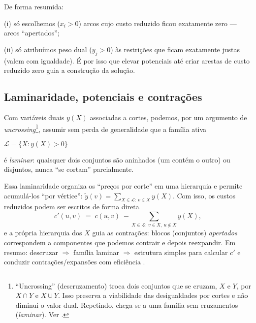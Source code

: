 De forma resumida:

(i) só escolhemos (\(x_i>0\)) arcos cujo custo reduzido ficou exatamente zero — arcos “apertados”;

(ii) só atribuímos peso dual (\(y_j>0\)) às restrições que ficam exatamente justas (valem com igualdade). É por isso que elevar potenciais até criar arestas de custo reduzido zero guia a construção da solução.

\subsection{Laminaridade, potenciais e contrações}


Com variáveis duais \(y(X)\) associadas a cortes, podemos, por um argumento de \emph{uncrossing}\footnote{“Uncrossing” (descruzamento) troca dois conjuntos que se cruzam, \(X\) e \(Y\), por \(X\cap Y\) e \(X\cup Y\). Isso preserva a viabilidade das desigualdades por cortes e não diminui o valor dual. Repetindo, chega-se a uma família sem cruzamentos (\emph{laminar}). Ver \cite{schrijver2003comb,frank2014}.}, assumir sem perda de generalidade que a família ativa

\(\mathcal{L}=\{X\colon y(X)>0\}\)


é \emph{laminar}: quaisquer dois conjuntos são aninhados (um contém o outro) ou disjuntos, nunca “se cortam” parcialmente.


Essa laminaridade organiza os “preços por corte” em uma hierarquia e permite acumulá-los “por vértice”: \(\tilde y(v)=\sum_{X\in\mathcal{L}:\,v\in X} y(X)\). Com isso, os custos reduzidos podem ser escritos de forma direta
\[
	c'(u,v)\;=\; c(u,v)\; -\! \sum_{X\in\mathcal{L}:\, v\in X,\ u\notin X} y(X),
\]
e a própria hierarquia dos \(X\) guia as contrações: blocos (conjuntos) \emph{apertados} correspondem a componentes que podemos contrair e depois reexpandir. Em resumo: descruzar \(\Rightarrow\) família laminar \(\Rightarrow\) estrutura simples para calcular \(c'\) e conduzir contrações/expansões com eficiência \cite{frank2014,schrijver2003comb}.

